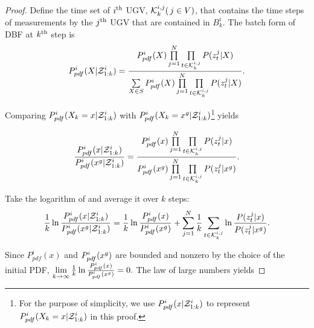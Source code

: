 	\begin{proof}	
		Define the time set of $i^\text{th}$ UGV, $\mathcal{K}^{i,j}_{k}(\,j\in V)$, that contains the time steps of measurements by the $j^\text{th}$ UGV that are contained in $B^i_k$.
		The batch form of DBF at $k^\text{th}$ step is
		\small\begin{equation*}
		P^i_{pdf}(X|\mathcal{Z}^i_{1:k})=\frac{P^i_{pdf}(X)\prod\limits_{j=1}^{N}\prod\limits_{t\in\mathcal{K}^{i,j}_{k}}P(z^j_t|X)}{\sum\limits_{X\in S}P^i_{pdf}(X)\prod\limits_{j=1}^{N}\prod\limits_{t\in\mathcal{K}^{i,j}_{k}}P(z^j_t|X)}.
		\end{equation*}\normalsize
		
		Comparing $P^i_{pdf}(X_k=x|\mathcal{Z}^i_{1:k})$ with $P^i_{pdf}(X_k=x^g|\mathcal{Z}^i_{1:k})$\footnote{For the purpose of simplicity, we use $P^i_{pdf}(x|\mathcal{Z}^i_{1:k})$ to represent $P^i_{pdf}(X_k=x|\mathcal{Z}^i_{1:k})$ in this proof.} yields
		
		\small\begin{equation}\label{eqn:cmp}
		\frac{P^i_{pdf}(x|\mathcal{Z}^i_{1:k})}{P^i_{pdf}(x^g|\mathcal{Z}^i_{1:k})}=\frac{P^i_{pdf}(x)\prod\limits_{j=1}^{N}\prod\limits_{t\in\mathcal{K}^{i,j}_{k}}P(z^j_t|x)}{P^i_{pdf}(x^g)\prod\limits_{j=1}^{N}\prod\limits_{t\in\mathcal{K}^{i,j}_{k}}P(z^j_t|x^g)}.
		\end{equation}\normalsize
		
		Take the logarithm of  and average it over $k$ steps:
		\small\begin{equation}\label{eqn:cmp_log}
		\frac{1}{k}\ln\frac{P^i_{pdf}(x|\mathcal{Z}^i_{1:k})}{P^i_{pdf}(x^g|\mathcal{Z}^i_{1:k})}=\frac{1}{k}\ln\frac{P^i_{pdf}(x)}{P^i_{pdf}(x^g)}+\sum\limits_{j=1}^{N}\frac{1}{k}\sum\limits_{t\in\mathcal{K}^{i,j}_{k}}\ln\frac{P(z^j_t|x)}{P(z^j_t|x^g)}.
		\end{equation}\normalsize
		
		Since $P^i_{pdf}(x)$ and $P^i_{pdf}(x^g)$ are bounded and nonzero by the choice of the initial PDF, $\lim\limits_{k\rightarrow \infty}\frac{1}{k}\ln\frac{P^i_{pdf}(x)}{P^i_{pdf}(x^g)}= 0.$
		The law of large numbers yields		
		

\end{proof}
